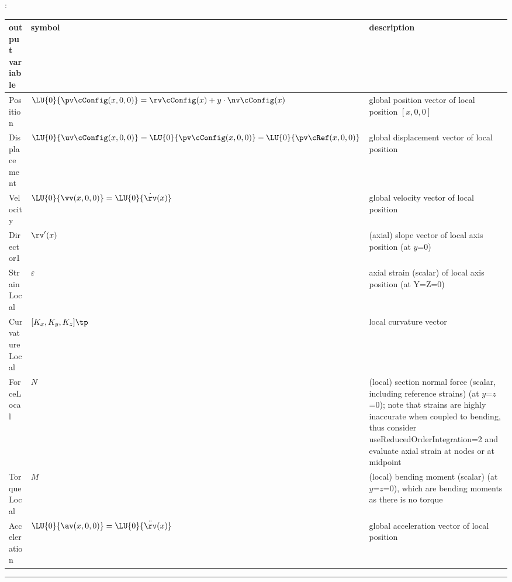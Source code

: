 :
\begin{center}
\footnotesize
\begin{longtable}{| p{5cm} | p{5cm} | p{6cm} |} 
\hline
\bf output variable & \bf symbol & \bf description \\ \hline
Position & $\LU{0}{\pv\cConfig(x,0,0)} = \rv\cConfig(x) + y\cdot \nv\cConfig(x)$ & global position vector of local position $[x,0,0]$\\ \hline
Displacement & $\LU{0}{\uv\cConfig(x,0,0)} = \LU{0}{\pv\cConfig(x,0,0)} - \LU{0}{\pv\cRef(x,0,0)}$ & global displacement vector of local position\\ \hline
Velocity & $\LU{0}{\vv(x,0,0)} = \LU{0}{\dot \rv(x)}$ & global velocity vector of local position\\ \hline
Director1 & $\rv'(x)$ & (axial) slope vector of local axis position (at $y$=0)\\ \hline
StrainLocal & $\varepsilon$ & axial strain (scalar) of local axis position (at Y=Z=0)\\ \hline
CurvatureLocal & $[K_x, K_y, K_z]\tp$ & local curvature vector\\ \hline
ForceLocal & $N$ &  (local) section normal force (scalar, including reference strains) (at $y$=$z$=0); note that strains are highly inaccurate when coupled to bending, thus consider useReducedOrderIntegration=2 and evaluate axial strain at nodes or at midpoint\\ \hline
TorqueLocal & $M$ &  (local) bending moment (scalar) (at $y$=$z$=0), which are bending moments as there is no torque\\ \hline
Acceleration & $\LU{0}{\av(x,0,0)} = \LU{0}{\ddot \rv(x)}$ & global acceleration vector of local position\\ \hline
\end{longtable}
\end{center}
 \noindent
\vspace{6pt}\par\noindent\rule{\textwidth}{0.4pt}
\label{miniExample_ObjectANCFThinPlate}
\pythonstyle
